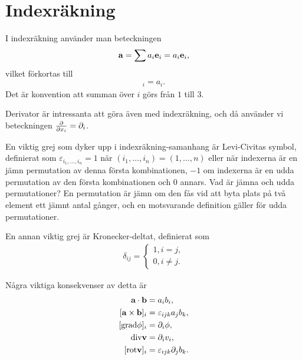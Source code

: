 \section{Indexräkning}

I indexräkning använder man beteckningen
\begin{align*}
	\vb{a} = \sum a_i\vb{e}_i = a_i\vb{e}_i,
\end{align*}
vilket förkortas till
\begin{align*}
	[\vb{a}]_i = a_i.
\end{align*}
Det är konvention att summan över $i$ görs från $1$ till $3$.

Derivator är intressanta att göra även med indexräkning, och då använder vi beteckningen
$\pdv{x_i} = \del{i}$.

En viktig grej som dyker upp i indexräkning-samanhang är Levi-Civitas symbol, definierat som $\varepsilon_{i_1, \dots, i_n} = 1$ när $(i_1, \dots, i_n) = (1, \dots, n)$ eller när indexerna är en jämn permutation av denna första kombinationen, $-1$ om indexerna är en udda permutation av den första kombinationen och $0$ annars. Vad är jämna och udda permutationer? En permutation är jämn om den fås vid att byta plats på två element ett jämnt antal gånger, och en motsvarande definition gäller för udda permutationer.

En annan viktig grej är Kronecker-deltat, definierat som
\begin{align*}
	\delta_{ij} =
	\begin{cases}
		1, i = j, \\
		0, i\neq j.
	\end{cases}
\end{align*}

Några viktiga konsekvenser av detta är
\begin{align*}
	\vb{a}\cdot\vb{b}      &= a_ib_i, \\
	[\vb{a}\times\vb{b}]_i &= \leci{ijk}a_jb_k, \\
	[\grad{\phi}]_i        &= \del{i}{\phi}, \\
	\div{\vb{v}}           &= \del{i}{v_i}, \\
	[\curl{\vb{v}}]_i      &= \leci{ijk}\del{j}{b_k}.
\end{align*}